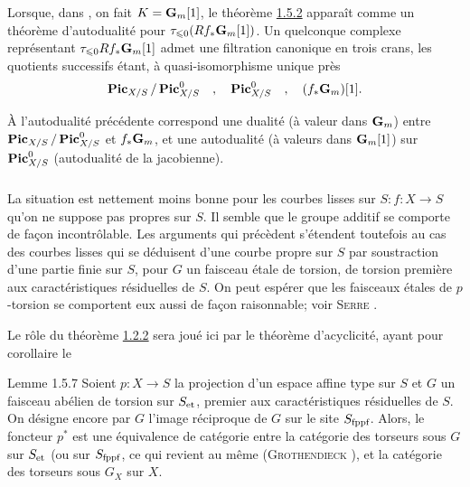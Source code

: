 \documentclass[10pt]{../fichiers-configuration-latex/smfart}
\begin{document}
\subsubsection{}
Lorsque, dans , on fait $K=\mathbf{G}_{m}[1]$, le théorème
\hyperref[XVIII.thm1.5.2]{1.5.2} apparaît comme un théorème d'autodualité pour $\tau_{\leqslant
0}(Rf_{\ast}\mathbf{G}_{m}[1])$. Un quelconque complexe représentant
$\tau_{\leqslant 0} Rf_{\ast} \mathbf{G}_{m}[1]$ admet une filtration
canonique en trois crans, les quotients successifs étant, à
quasi-isomorphisme unique près
$$
\operatorname{\mathbf{Pic}}_{X/S}/\operatorname{\mathbf{Pic}}^{0}_{X/S}\quad,\quad \operatorname{\mathbf{Pic}}^{0}_{X/S}\quad,\quad
(f_{\ast}\mathbf{G}_{m})[1]{}.
$$

À l'autodualité précédente correspond une dualité (à valeur dans
$\mathbf{G}_{m}$) entre $\operatorname{\mathbf{Pic}}_{X/S}/\operatorname{\mathbf{Pic}}^{0}_{X/S}$ et
$f_{\ast}\mathbf{G}_{m}$, et une autodualité (à valeurs dans
$\mathbf{G}_{m}[1]$) sur $\operatorname{\mathbf{Pic}}^{0}_{X/S}$ (autodualité de la
jacobienne).

\subsubsection{}
La situation est nettement moins bonne pour les courbes lisses sur
$S:f:X\rightarrow S$ qu'on ne suppose pas propres sur $S$. Il semble
que le groupe additif se comporte de façon incontrôlable. Les
arguments qui précèdent s'étendent toutefois au cas des courbes lisses
qui se déduisent d'une courbe propre sur $S$ par soustraction d'une
partie finie sur $S$, pour $G$ un faisceau étale de torsion, de
torsion première aux caractéristiques résiduelles de $S$. On peut
espérer que les faisceaux étales de $p$-torsion se comportent eux
aussi de façon raisonnable; voir \textsc{Serre}
\cite[Ch.~VI nᵒ 11 p.~126]{SGA4-18:6}.

Le rôle du théorème \hyperref[XVIII.thm1.2.2]{1.2.2} sera joué ici par le théorème
d'acyclicité\pageoriginale {}, ayant pour corollaire le

\begin{enonce*}{Lemme 1.5.7}
Soient $p:X\rightarrow S$ la projection d'un espace affine type sur
$S$ et $G$ un faisceau abélien de torsion sur $S_{\text{\rm et}}$,
premier aux caractéristiques résiduelles de $S$. On désigne encore par
$G$ l'image réciproque de $G$ sur le site $S_{\text{\rm
fppf}}$. Alors, le foncteur $p^{\ast}$ est une équivalence de
catégorie entre la catégorie des torseurs sous $G$ sur $S_{\text{\rm
et}}$ (ou sur $S_{\text{\rm fppf}}$, ce qui revient au même
{(\textsc{Grothendieck} \cite[Corollaire~11.9]{SGA4-18:2})}, et la catégorie des torseurs sous $G_{X}$
sur $X$.
\end{enonce*}
\end{document}
